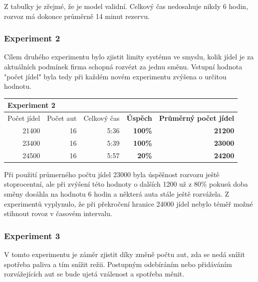 \documentclass[a4paper, 11pt]{article}
\begin{document}
	Z tabulky je zřejmé, že je model validní. Celkový čas nedosahuje nikdy
	6 hodin, rozvoz má dokonce průměrně 14 minut rezervu.

	\subsubsection{Experiment 2}

	Cílem druhého experimentu bylo zjistit limity systému ve smyslu, kolik
	jídel je za aktuálních podmínek firma schopná rozvézt za jednu směnu. 
	Vstupní hodnota "počet jídel" byla tedy při každém novém experimentu
	zvýšena o určitou hodnotu. 

	\begin{table}[h!]
		\centering
		\begin{tabular}{|r|r|r|r|r|}
			\hline
			\multicolumn{5}{|l|}{\textbf{Experiment 2}}   \\ \hline
			 Počet jídel & Počet aut & Celkový čas & \textbf{Úspěch} & \textbf{Průměrný počet jídel} \\ \hline
			 21400 & 16 & 5:36 & \textbf{100\%} & \textbf{21200} \\ \hline
			 23400 & 16 & 5:39 & \textbf{100\%} & \textbf{23000} \\ \hline
			 24500 & 16 & 5:57 & \textbf{20\%}  & \textbf{24200} \\ \hline
		\end{tabular}
	\end{table}

	Při použití průmerného počtu jídel 23000 byla úspěšnost rozvozu ještě
	stoprocentní, ale při zvýšení této hodnoty o dalších 1200 už z 80\% 
	pokusů doba směny dosáhla na hodnotu 6 hodin a některá auta stále ještě
	rozvážela. Z experimentů vyplynulo, že při překročení hranice 24000 jídel
	nebylo téměř možné stihnout rovoz v časovém intervalu.

	\subsubsection{Experiment 3}

	V tomto experimentu je záměr zjistit díky změně počtu aut, zda se nedá 
	snížit spotřeba paliva a tím snížit režii. Postupným odebíráním nebo 
	přidáváním rozvážejících aut se bude ujetá vzálenost a spotřeba měnit.
\end{document}
